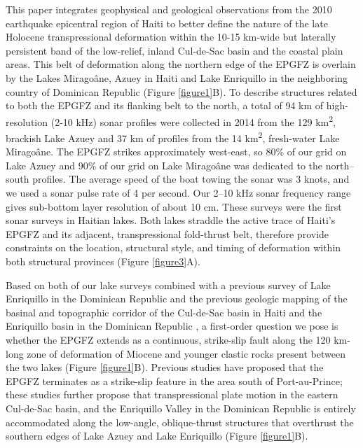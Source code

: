\documentclass[man,natbib]{apa6}
\begin{document}
This paper integrates geophysical and geological observations from the 2010 earthquake epicentral region of Haiti to better define the nature of the late Holocene transpressional deformation within the 10-15 km-wide but laterally persistent band of the low-relief, inland Cul-de-Sac basin and the coastal plain areas. This belt of deformation along the northern edge of the EPGFZ is overlain by the Lakes Mirago\^ane, Azuey in Haiti and Lake Enriquillo in the neighboring country of Dominican Republic (Figure \ref{figure1}B). To describe structures related to both the EPGFZ and its flanking belt to the north, a total of 94 km of high-resolution (2-10 kHz) sonar profiles were collected in 2014 from the 129 km\textsuperscript{2}, brackish Lake Azuey and 37 km of profiles from the 14 km\textsuperscript{2}, fresh-water Lake Mirago\^ane. The EPGFZ strikes approximately west-east, so 80\% of our grid on Lake Azuey and 90\% of our grid on Lake Mirago\^ane was dedicated to the north--south profiles. The average speed of the boat towing the sonar was 3 knots, and we used a sonar pulse rate of 4 per second. Our 2--10 kHz sonar frequency range gives sub-bottom layer resolution of about 10 cm. These surveys were the first sonar surveys in Haitian lakes. Both lakes straddle the active trace of Haiti's EPGFZ and its adjacent, transpressional fold-thrust belt, therefore provide constraints on the location, structural style, and timing of deformation within both structural provinces (Figure \ref{figure3}A).

Based on both of our lake surveys combined with a previous survey of Lake Enriquillo in the Dominican Republic \citep{rios2013holocene} and the previous geologic mapping of the basinal and topographic corridor of the Cul-de-Sac basin in Haiti and the Enriquillo basin in the Dominican Republic \citep{mann1995actively,mann1999caribbean}, a first-order question we pose is whether the EPGFZ extends as a continuous, strike-slip fault along the 120 km-long zone of deformation of Miocene and younger clastic rocks present between the two lakes (Figure \ref{figure1}B). Previous studies  \citep{saint2015seismotectonics,symithe2016present} have proposed that the EPGFZ terminates as a strike-slip feature in the area south of Port-au-Prince; these studies further propose that transpressional plate motion in the eastern Cul-de-Sac basin, and the Enriquillo Valley in the Dominican Republic is entirely accommodated along the low-angle, oblique-thrust structures that overthrust the southern edges of Lake Azuey and Lake Enriquillo (Figure \ref{figure1}B).   
\end{document}
